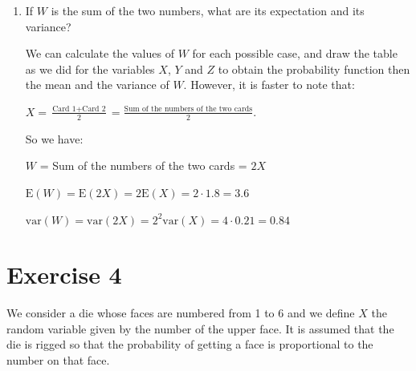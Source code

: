 \documentclass[12pt,thmsa]{article}\usepackage[]{graphicx}\usepackage[]{color}
\begin{document}
\begin{enumerate}
\begin{itemize}
\end{itemize}
    \item If $W$ is the sum of the two numbers, what are its expectation and its variance?

We can calculate the values of $ W $ for each possible case, and draw the table as we did for the variables $ X $, $ Y $ and $ Z $ to obtain the probability function then the mean and the variance of $ W $. However, it is faster to note that:
\begin{center}
$\displaystyle X= \frac{\textrm{Card 1} + \textrm{Card 2}}{2}=\frac{\textrm{Sum of the numbers of the two cards}}{2}.$
\end{center}
So we have:
\begin{center}

$W$ = Sum of the numbers of the two cards = $2X$
\medskip

$\mbox{E}(W) = \mbox{E}(2X) = 2\mbox{E}(X) = 2 \cdot 1.8 = 3.6$
\medskip

$\mbox{var}(W) = \mbox{var}(2X) = 2^2\mbox{var}(X) = 4\cdot 0.21 = 0.84$

\end{center}

\end{enumerate}




\section*{Exercise 4} %

We consider a die whose faces are numbered from 1 to 6 and we define $X$ the random variable given by the number of the upper face. It is assumed that the die is rigged so that the probability of getting a face is proportional to the number on that face.
\end{document}
